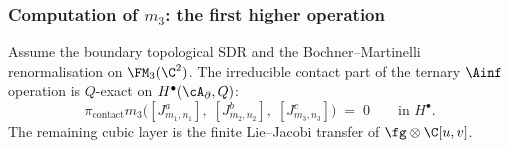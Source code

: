 \subsubsection{Computation of \texorpdfstring{$m_3$}{m3}: the first higher operation}

\begin{theorem}
\label{thm:DDCA-m3}
Assume the boundary topological SDR and the
Bochner--Martinelli renormalisation on $\FM_3(\C^2)$.
The irreducible contact part of the ternary $\Ainf$ operation
is $Q$-exact on $H^\bullet(\cA_\partial, Q)$:
\[
 \pi_{\mathrm{contact}}m_3\bigl([J^a_{m_1,n_1}],\;
 [J^b_{m_2,n_2}],\;
 [J^c_{m_3,n_3}]\bigr)
 \;=\; 0
 \qquad
 \text{in } H^\bullet.
\]
The remaining cubic layer is the finite Lie--Jacobi transfer
of $\fg\otimes\C[u,v]$.
\end{theorem}

